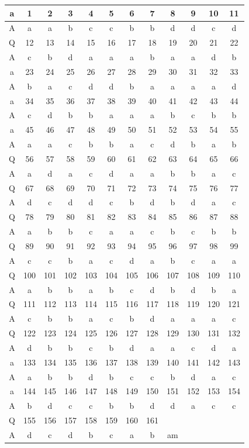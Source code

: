 \documentclass[10pt]{article}
\begin{document}
\begin{center}
\begin{tabular}{|c|c|c|c|c|c|c|c|c|c|c|c|}
\hline
a & 1 & 2 & 3 & 4 & 5 & 6 & 7 & 8 & 9 & 10 & 11 \\
\hline
A & a & a & b & c & c & b & b & d & d & c & d \\
\hline
Q & 12 & 13 & 14 & 15 & 16 & 17 & 18 & 19 & 20 & 21 & 22 \\
\hline
A & c & b & d & a & a & a & b & a & a & d & b \\
\hline
a & 23 & 24 & 25 & 26 & 27 & 28 & 29 & 30 & 31 & 32 & 33 \\
\hline
A & b & a & c & d & d & b & a & a & a & a & d \\
\hline
a & 34 & 35 & 36 & 37 & 38 & 39 & 40 & 41 & 42 & 43 & 44 \\
\hline
A & c & d & b & b & a & a & a & b & c & b & b \\
\hline
a & 45 & 46 & 47 & 48 & 49 & 50 & 51 & 52 & 53 & 54 & 55 \\
\hline
A & a & a & c & b & b & a & c & d & b & a & b \\
\hline
Q & 56 & 57 & 58 & 59 & 60 & 61 & 62 & 63 & 64 & 65 & 66 \\
\hline
A & a & d & a & c & d & a & a & b & b & a & c \\
\hline
Q & 67 & 68 & 69 & 70 & 71 & 72 & 73 & 74 & 75 & 76 & 77 \\
\hline
A & d & c & d & d & c & b & d & b & d & a & c \\
\hline
Q & 78 & 79 & 80 & 81 & 82 & 83 & 84 & 85 & 86 & 87 & 88 \\
\hline
A & a & b & b & c & a & a & c & b & c & b & b \\
\hline
Q & 89 & 90 & 91 & 92 & 93 & 94 & 95 & 96 & 97 & 98 & 99 \\
\hline
A & c & c & b & a & c & d & a & b & c & a & a \\
\hline
Q & 100 & 101 & 102 & 103 & 104 & 105 & 106 & 107 & 108 & 109 & 110 \\
\hline
A & a & b & b & a & b & c & d & b & d & b & a \\
\hline
Q & 111 & 112 & 113 & 114 & 115 & 116 & 117 & 118 & 119 & 120 & 121 \\
\hline
A & c & b & b & a & c & b & d & a & a & a & c \\
\hline
Q & 122 & 123 & 124 & 125 & 126 & 127 & 128 & 129 & 130 & 131 & 132 \\
\hline
A & d & b & b & c & b & d & a & a & c & d & a \\
\hline
a & 133 & 134 & 135 & 136 & 137 & 138 & 139 & 140 & 141 & 142 & 143 \\
\hline
A & a & b & b & d & b & c & c & b & d & a & c \\
\hline
a & 144 & 145 & 146 & 147 & 148 & 149 & 150 & 151 & 152 & 153 & 154 \\
\hline
A & b & d & c & c & b & b & d & d & a & c & c \\
\hline
Q & 155 & 156 & 157 & 158 & 159 & 160 & 161 &  &  &  &  \\
\hline
A & d & c & d & b & c & a & b & am &  &  &  \\
\hline
\end{tabular}
\end{center}
\end{document}
